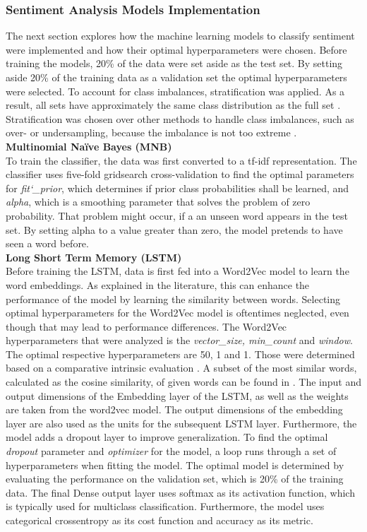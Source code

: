 \documentclass[11pt, a4paper]{article}
\begin{document}
\subsubsection{Sentiment Analysis Models Implementation}
The next section explores how the machine learning models to classify sentiment were implemented and how their optimal hyperparameters were chosen.
Before training the models, 20\% of the data were set aside as the test set. By setting aside 20\% of the training data as a validation set 
the optimal hyperparameters were selected. To account for class imbalances, stratification was applied. As a result, all sets have approximately the same
class distribution as the full set \citep{sahu2017stratification}.
Stratification was chosen over other methods to handle class imbalances, such as over- or undersampling, because the imbalance
is not too extreme \citep{ganganwar2012overview}.\\

\noindent\textbf{Multinomial Naïve Bayes (MNB)}\\
To train the classifier, the data was first converted to a tf-idf representation.
The classifier uses five-fold gridsearch cross-validation to find the optimal parameters for
\emph{fit\char`_prior}, which determines if prior class probabilities shall be learned, and \emph{alpha}, which is a smoothing parameter that solves
the problem of zero probability. That problem might occur, if a an unseen word appears in the test set. By setting alpha to a value greater than
zero, the model pretends to have seen a word before.\\

\noindent\textbf{Long Short Term Memory (LSTM)}\\
Before training the LSTM, data is first fed into a Word2Vec model to learn the word embeddings. As explained in the literature, this can enhance the performance of the model by learning the similarity between words.
Selecting optimal hyperparameters for the Word2Vec model is oftentimes neglected, even though that may lead to performance differences.
The Word2Vec hyperparameters that were analyzed is the \emph{vector\_size, min\_count} and \emph{window}. The optimal respective hyperparameters are 50, 1 and 1. Those were determined based on a comparative intrinsic evaluation \citep{schnabel2015embeddings}.
A subset of the most similar words, calculated as the cosine similarity, of given words can be found in .
The input and output dimensions of the Embedding layer of the LSTM, as well as the weights are taken from the word2vec model.
The output dimensions of the embedding layer are also used as the units for the subsequent LSTM layer. Furthermore, the model adds a dropout layer to improve generalization. To find the optimal \emph{dropout} parameter and \emph{optimizer} for the model,
a loop runs through a set of hyperparameters when fitting the model. The optimal model is determined by evaluating the performance on the validation set, which is 20\% of the training data. 
The final Dense output layer uses softmax as its activation function, which is typically used for multiclass classification. 
Furthermore, the model uses categorical crossentropy as its cost function and accuracy as its metric.\\
\end{document}
